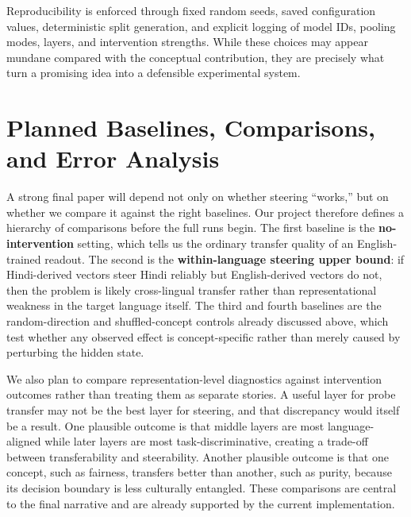 \documentclass[11pt]{article}
\begin{document}
Reproducibility is enforced through fixed random seeds, saved configuration values, deterministic split generation, and explicit logging of model IDs, pooling modes, layers, and intervention strengths. While these choices may appear mundane compared with the conceptual contribution, they are precisely what turn a promising idea into a defensible experimental system.

\section{Planned Baselines, Comparisons, and Error Analysis}
A strong final paper will depend not only on whether steering ``works,'' but on whether we compare it against the right baselines. Our project therefore defines a hierarchy of comparisons before the full runs begin. The first baseline is the \textbf{no-intervention} setting, which tells us the ordinary transfer quality of an English-trained readout. The second is the \textbf{within-language steering upper bound}: if Hindi-derived vectors steer Hindi reliably but English-derived vectors do not, then the problem is likely cross-lingual transfer rather than representational weakness in the target language itself. The third and fourth baselines are the random-direction and shuffled-concept controls already discussed above, which test whether any observed effect is concept-specific rather than merely caused by perturbing the hidden state.

We also plan to compare representation-level diagnostics against intervention outcomes rather than treating them as separate stories. A useful layer for probe transfer may not be the best layer for steering, and that discrepancy would itself be a result. One plausible outcome is that middle layers are most language-aligned while later layers are most task-discriminative, creating a trade-off between transferability and steerability. Another plausible outcome is that one concept, such as fairness, transfers better than another, such as purity, because its decision boundary is less culturally entangled. These comparisons are central to the final narrative and are already supported by the current implementation.
\end{document}
